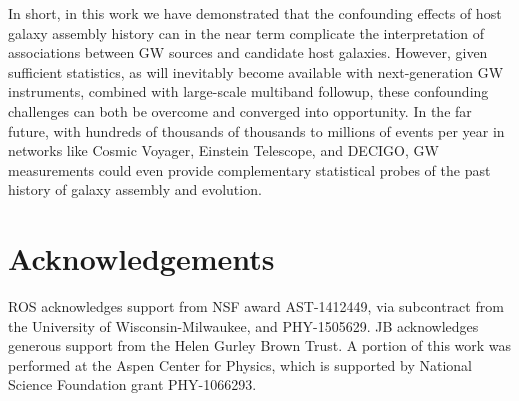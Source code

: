 \documentclass[a4paper,fleqn,usenatbib]{mnras}
\newcommand\jillianremark[1]{{\color{blue}#1}}
\begin{document}
In short, in this work we have demonstrated that  the confounding effects of host galaxy assembly history can in the
near term complicate the interpretation of associations between GW sources and candidate host galaxies.   However, given sufficient
statistics, as will inevitably become available with next-generation GW instruments, combined with large-scale
multiband followup, these confounding challenges can  both be overcome and converged into opportunity.   In the far future,  with hundreds of thousands of thousands to millions of events per year in
networks like Cosmic Voyager, Einstein Telescope, and DECIGO, GW measurements could even  provide complementary statistical probes of the past history of
galaxy assembly and evolution.  
%












\section*{Acknowledgements}
ROS acknowledges support from NSF award AST-1412449, via subcontract from the University of Wisconsin-Milwaukee, and PHY-1505629.
%
JB acknowledges generous support  from the Helen Gurley Brown Trust.
A portion of this work was performed at the Aspen Center for Physics, which is supported by National Science Foundation grant PHY-1066293.







\end{document}
